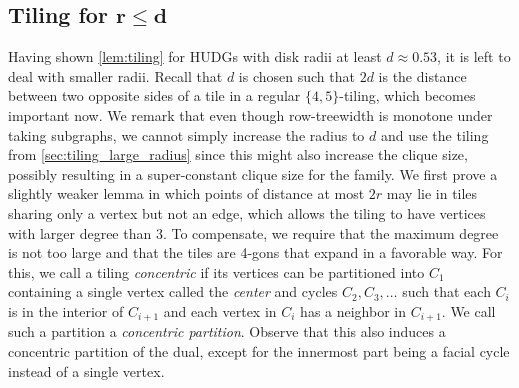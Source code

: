 \subsection{Tiling for \texorpdfstring{$ \bm{r \leq d} $}{r < d}}
\label{sec:tiling_small_radius}
%
%
Having shown \cref{lem:tiling} for HUDGs with disk radii at least $ d \approx 0.53 $, it is left to deal with smaller radii.
Recall that $ d $ is chosen such that $ 2d $ is the distance between two opposite sides of a tile in a regular $ \{ 4, 5 \} $-tiling, which becomes important now.
We remark that even though row-treewidth is monotone under taking subgraphs, we cannot simply increase the radius to $ d $ and use the tiling from \cref{sec:tiling_large_radius} since this might also increase the clique size, possibly resulting in a super-constant clique size for the family.
We first prove a slightly weaker lemma in which points of distance at most $ 2r $ may lie in tiles sharing only a vertex but not an edge, which allows the tiling to have vertices with larger degree than 3.
To compensate, we require that the maximum degree is not too large and that the tiles are 4-gons that expand in a favorable way.
For this, we call a tiling \emph{concentric} if its vertices can be partitioned into $ C_1 $ containing a single vertex called the \emph{center} and cycles $ C_2, C_3, \dots $ such that each $ C_i $ is in the interior of $ C_{i + 1} $ and each vertex in $ C_i $ has a neighbor in $ C_{i + 1} $.
We call such a partition a \emph{concentric partition}.
Observe that this also induces a concentric partition of the dual, except for the innermost part being a facial cycle instead of a single vertex.
%
%
